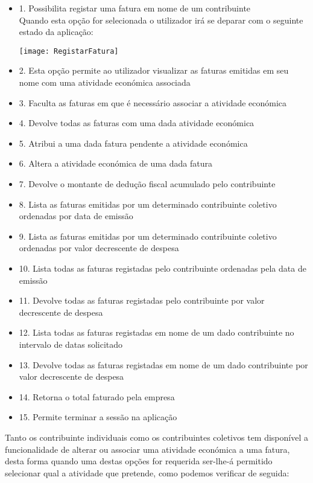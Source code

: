 \documentclass[10pt,a4paper]{article}
\begin{document}
\begin{itemize}
 \item 1. Possibilita registar uma fatura em nome de um contribuinte\\

 Quando esta opção for selecionada o utilizador irá se deparar com o seguinte estado da aplicação:

\begin{center}
\graphicspath{ {/home/jessica/Desktop/} }
\texttt{[image: RegistarFatura]}\\
\end{center}

 \item 2. Esta opção permite ao utilizador visualizar as faturas emitidas em seu nome com uma atividade económica associada
 \item 3. Faculta as faturas em que é necessário associar a atividade económica
 \item 4. Devolve todas as faturas com uma dada atividade económica
 \item 5. Atribui a uma dada fatura pendente a atividade económica
 \item 6. Altera a atividade económica de uma dada fatura
 \item 7. Devolve o montante de dedução fiscal acumulado pelo contribuinte
  \item 8. Lista as faturas emitidas por um determinado contribuinte coletivo ordenadas por data de emissão
 \item 9. Lista as faturas emitidas por um determinado contribuinte coletivo ordenadas por valor decrescente de despesa
 \item 10. Lista todas as faturas registadas pelo contribuinte ordenadas pela data de emissão
 \item 11. Devolve todas as faturas registadas pelo contribuinte por valor decrescente de despesa
 \item 12. Lista todas as faturas registadas em nome de um dado contribuinte no intervalo de datas solicitado
 \item 13. Devolve todas as faturas registadas em nome de um dado contribuinte por valor decrescente de despesa
 \item 14. Retorna o total faturado pela empresa
 \item 15. Permite terminar a sessão na aplicação
\end{itemize}


Tanto os contribuinte individuais como os contribuintes coletivos tem disponível a funcionalidade de alterar ou associar uma atividade económica a uma fatura, desta forma quando uma destas opções for requerida ser-lhe-á permitido selecionar qual a atividade que pretende, como podemos verificar de seguida: 
\end{document}
